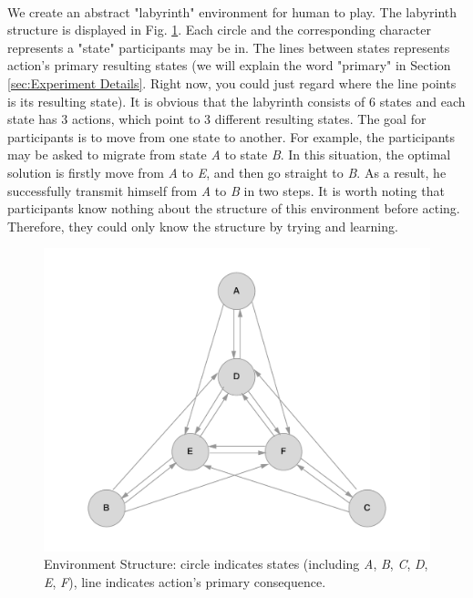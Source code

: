 \paragraph{}
We create an abstract "labyrinth" environment for human to play. The labyrinth structure is displayed in Fig. \ref{fig:Environment Structure}. Each circle and the corresponding character represents a "state" participants may be in. The lines between states represents action's primary resulting states (we will explain the word "primary" in Section \ref{sec:Experiment Details}. Right now, you could just regard where the line points is its resulting state). It is obvious that the labyrinth consists of 6 states and each state has 3 actions, which point to 3 different resulting states. The goal for participants is to move from one state to another. For example, the participants may be asked to migrate from state \emph{A} to state \emph{B}. In this situation, the optimal solution is firstly move from \emph{A} to \emph{E}, and then go straight to \emph{B}. As a result, he successfully transmit himself from \emph{A} to \emph{B} in two steps. It is worth noting that participants know nothing about the structure of this environment before acting. Therefore, they could only know the structure by trying and learning. 

\begin{figure}[ht]
\centering
\includegraphics[width=\columnwidth]{Figures/environment_structure}
\decoRule
\caption[Environment Structure]{Environment Structure: circle indicates states (including \emph{A}, \emph{B}, \emph{C}, \emph{D}, \emph{E}, \emph{F}), line indicates action's primary consequence. }
\label{fig:Environment Structure}
\end{figure}

